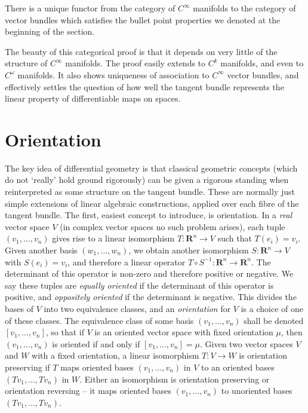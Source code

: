 \begin{theorem}
    There is a unique functor from the category of $C^\infty$ manifolds to the category of vector bundles which satisfies the bullet point properties we denoted at the beginning of the section.
\end{theorem}

The beauty of this categorical proof is that it depends on very little of the structure of $C^\infty$ manifolds. The proof easily extends to $C^k$ manifolds, and even to $C^\omega$ manifolds. It also shows uniqueness of association to $C^\infty$ vector bundles, and effectively settles the question of how well the tangent bundle represents the linear property of differentiable maps on spaces.

\section{Orientation}

The key idea of differential geometry is that classical geometric concepts (which do not `really' hold ground rigorously) can be given a rigorous standing when reinterpreted as some structure on the tangent bundle. These are normally just simple extensions of linear algebraic constructions, applied over each fibre of the tangent bundle. The first, easiest concept to introduce, is orientation. In a {\it real} vector space $V$ (in complex vector spaces no such problem arises), each tuple $(v_1, \dots, v_n)$ gives rise to a linear isomorphism $T: \mathbf{R}^n \to V$ such that $T(e_i) = v_i$. Given another basis $(w_1, \dots, w_n)$, we obtain another isomorphism $S: \mathbf{R}^n \to V$ with $S(e_i) = v_i$, and therefore a linear operator $T \circ S^{-1}: \mathbf{R}^n \to \mathbf{R}^n$. The determinant of this operator is non-zero and therefore positive or negative. We say these tuples are {\it equally oriented} if the determinant of this operator is positive, and {\it oppositely oriented} if the determinant is negative. This divides the bases of $V$ into two equivalence classes, and an \emph{orientation} for $V$ is a choice of one of these classes. The equivalence class of some basis $(v_1, \dots, v_n)$ shall be denoted $[v_1, \dots, v_n]$, so that if $V$ is an oriented vector space with fixed orientation $\mu$, then $(v_1, \dots, v_n)$ is oriented if and only if $[v_1, \dots, v_n] = \mu$. Given two vector spaces $V$ and $W$ with a fixed orientation, a linear isomorphism $T: V \to W$ is orientation preserving if $T$ maps oriented bases $(v_1, \dots, v_n)$ in $V$ to an oriented bases $(Tv_1, \dots, Tv_n)$ in $W$. Either an isomorphism is orientation preserving or orientation reversing -- it maps oriented bases $(v_1, \dots, v_n)$ to unoriented bases $(Tv_1, \dots, Tv_n)$.


